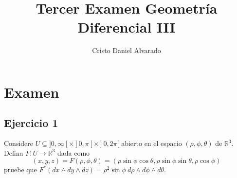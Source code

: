 \documentclass[12pt]{report}
\theoremstyle{largebreak}
\newcommand\cf[3]{\ensuremath{#1:#2\rightarrow#3}}
\begin{document}
    \title{Tercer Examen Geometría Diferencial III}
    \author{Cristo Daniel Alvarado}
    \maketitle

    \tableofcontents %

    
    \chapter{Examen}
    
    \renewcommand{\theenumi}{\roman{enumi}}
    \renewcommand{\labelenumi}{{(\theenumi)}}

    \section{Ejercicio 1}

    \begin{excer}
        Considere $U\subseteq ]0,\infty[\times]0,\pi[\times]0,2\pi[$ abierto en el espacio $(\rho, \phi, \theta)$ de $\mathbb{R}^3$. Defina $\cf{F}{U}{\mathbb{R}^3}$ dada como
        \begin{equation*}
            (x,y,z)=F(\rho,\phi,\theta)=(\rho\sin\phi\cos\theta,\rho\sin\phi\sin\theta,\rho\cos\phi)
        \end{equation*}
        pruebe que $F^*(dx\wedge dy\wedge dz)=\rho^2\sin\phi\:d\rho\wedge d\phi\wedge d\theta$.
    \end{excer}
\end{document}
